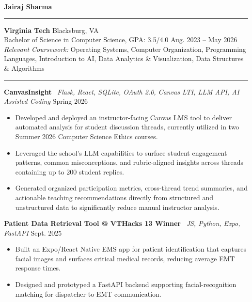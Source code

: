 \documentclass[letterpaper,10pt]{article}
\newcommand{\resumesection}[1]{%
    \vspace{6pt}
    \noindent{\large\bfseries #1}\par
    \vspace{2pt}
    \hrule
    \vspace{4pt}
}
\begin{document}
\begin{center}
    {\LARGE \textbf{Jairaj Sharma}}\\[2.5pt]
\end{center}

\vspace{4pt}

\resumesection{Education}
\textbf{Virginia Tech} \hfill Blacksburg, VA\\
Bachelor of Science in Computer Science, GPA: 3.5/4.0 \hfill Aug. 2023 -- May 2026\\
\textit{Relevant Coursework:} Operating Systems, Computer Organization, Programming Languages, Introduction to AI, Data Analytics \& Visualization, Data Structures \& Algorithms

\resumesection{Projects}

\textbf{CanvasInsight} \textbar\ \textit{Flask, React, SQLite, OAuth 2.0, Canvas LTI, LLM API, AI Assisted Coding} \hfill Spring 2026
\begin{itemize}
    \item Developed and deployed an instructor-facing Canvas LMS tool to deliver automated analysis for student discussion threads, currently utilized in two Summer 2026 Computer Science Ethics courses.
    \item Leveraged the school’s LLM capabilities to surface student engagement patterns, common misconceptions, and rubric-aligned insights across threads containing up to 200 student replies.
    \item Generated organized participation metrics, cross-thread trend summaries, and actionable teaching recommendations directly from structured and unstructured data to significantly reduce manual instructor analysis.
\end{itemize}

\textbf{Patient Data Retrieval Tool @ VTHacks 13 Winner} \textbar\ \textit{JS, Python, Expo, FastAPI} \hfill Sept. 2025
\begin{itemize}
    \item Built an Expo/React Native EMS app for patient identification that captures facial images and surfaces critical medical records, reducing average EMT response times.
    \item Designed and prototyped a FastAPI backend supporting facial-recognition matching for dispatcher-to-EMT communication.
\end{itemize}
\end{document}
